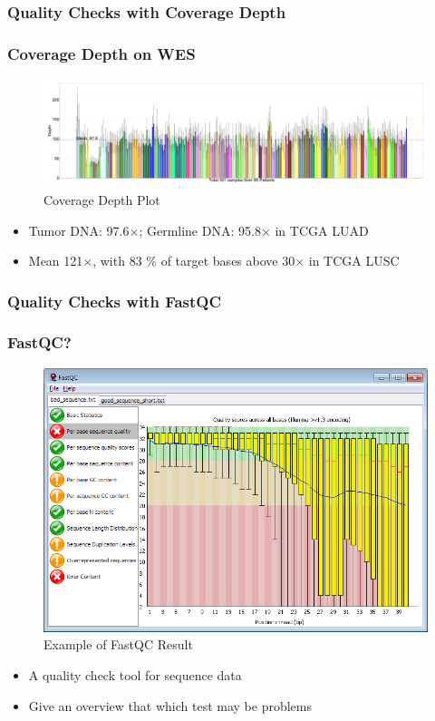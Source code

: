 \documentclass{beamer}
\begin{document}
    \subsubsection{Quality Checks with Coverage Depth}
    \begin{frame}
        \frametitle{Coverage Depth on WES}

        \begin{figure}
            \includegraphics[width=\linewidth]{figures/FastQC/BWA.pdf}
            \caption{Coverage Depth Plot}
        \end{figure}

        \begin{itemize}
            \item Tumor DNA: 97.6$\times$; Germline DNA: 95.8$\times$ in TCGA LUAD \cite{LUAD-1}
            \item Mean 121$\times$, with 83 \% of target bases above 30$\times$ in TCGA LUSC \cite{LUSC-1}
        \end{itemize}
    \end{frame}

    \subsubsection{Quality Checks with FastQC}
    \begin{frame}
        \frametitle{FastQC?}

        \begin{figure}
            \includegraphics[width=0.5 \linewidth]{figures/Workflow/FastQC.png}
            \caption{Example of FastQC Result \protect\cite{fastqc1}}
        \end{figure}

        \begin{itemize}
            \item A quality check tool for sequence data
            \item Give an overview that which test may be problems
        \end{itemize}
    \end{frame}
\end{document}
